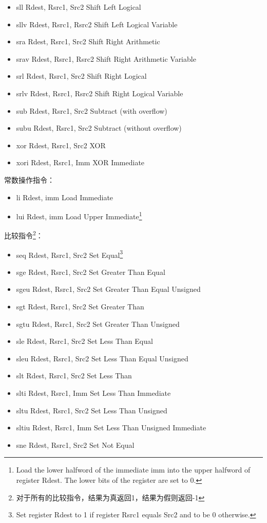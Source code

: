 \documentclass[a4paper, 11pt]{article}
\begin{document}
\begin{itemize}
		\item sll Rdest, Rsrc1, Src2	\hfill Shift Left Logical
		\item sllv Rdest, Rsrc1, Rsrc2	\hfill Shift Left Logical Variable
		\item sra Rdest, Rsrc1, Src2	\hfill Shift Right Arithmetic
		\item srav Rdest, Rsrc1, Rsrc2	\hfill Shift Right Arithmetic Variable
		\item srl Rdest, Rsrc1, Src2	\hfill Shift Right Logical
		\item srlv Rdest, Rsrc1, Rsrc2	\hfill Shift Right Logical Variable
		\item sub Rdest, Rsrc1, Src2	\hfill Subtract (with overflow)
		\item subu Rdest, Rsrc1, Src2	\hfill Subtract (without overflow)
		\item xor Rdest, Rsrc1, Src2	\hfill XOR
		\item xori Rdest, Rsrc1, Imm	\hfill XOR Immediate
	\end{itemize}
	常数操作指令：
	\begin{itemize}
		\item li Rdest, imm	\hfill Load Immediate
		\item lui Rdest, imm	\hfill Load Upper Immediate\footnote{Load the lower halfword of the immediate imm into the upper halfword of register Rdest. The lower bits of the register are set to 0.}
	\end{itemize}
	比较指令\footnote{对于所有的比较指令，结果为真返回1，结果为假则返回-1}：
	\begin{itemize}
		\item seq Rdest, Rsrc1, Src2	\hfill Set Equal\footnote{Set register Rdest to 1 if register Rsrc1 equals Src2 and to be 0 otherwise.}
		\item sge Rdest, Rsrc1, Src2	\hfill Set Greater Than Equal
		\item sgeu Rdest, Rsrc1, Src2	\hfill Set Greater Than Equal Unsigned
		\item sgt Rdest, Rsrc1, Src2	\hfill Set Greater Than
		\item sgtu Rdest, Rsrc1, Src2	\hfill Set Greater Than Unsigned
		\item sle Rdest, Rsrc1, Src2	\hfill Set Less Than Equal
		\item sleu Rdest, Rsrc1, Src2	\hfill Set Less Than Equal Unsigned
		\item slt Rdest, Rsrc1, Src2	\hfill Set Less Than
		\item slti Rdest, Rsrc1, Imm	\hfill Set Less Than Immediate
		\item sltu Rdest, Rsrc1, Src2	\hfill Set Less Than Unsigned
		\item sltiu Rdest, Rsrc1, Imm	\hfill Set Less Than Unsigned Immediate
		\item sne Rdest, Rsrc1, Src2	\hfill Set Not Equal
	\end{itemize}
\end{document}
